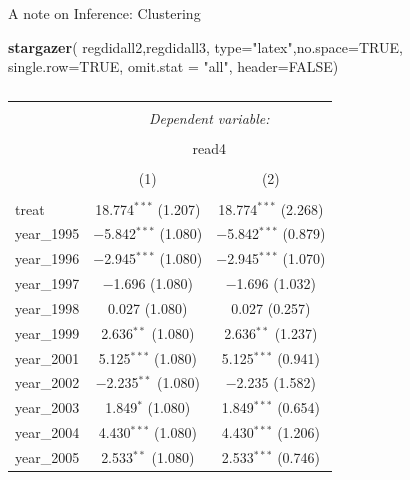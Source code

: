 \documentclass[
  ignorenonframetext,
]{beamer}
\newenvironment{Shaded}{\begin{snugshade}}{\end{snugshade}}
\newcommand{\DataTypeTok}[1]{\textcolor[rgb]{0.13,0.29,0.53}{#1}}
\newcommand{\KeywordTok}[1]{\textcolor[rgb]{0.13,0.29,0.53}{\textbf{#1}}}
\newcommand{\NormalTok}[1]{#1}
\newcommand{\OtherTok}[1]{\textcolor[rgb]{0.56,0.35,0.01}{#1}}
\newcommand{\StringTok}[1]{\textcolor[rgb]{0.31,0.60,0.02}{#1}}
\begin{document}
\begin{frame}[fragile]{A note on Inference: Clustering}
\protect\hypertarget{a-note-on-inference-clustering-2}{}
\tiny

\begin{Shaded}
\begin{Highlighting}[]
\KeywordTok{stargazer}\NormalTok{( regdidall2,regdidall3, }\DataTypeTok{type=}\StringTok{"latex"}\NormalTok{,}\DataTypeTok{no.space=}\OtherTok{TRUE}\NormalTok{, }\DataTypeTok{single.row=}\OtherTok{TRUE}\NormalTok{, }\DataTypeTok{omit.stat =} \StringTok{"all"}\NormalTok{, }\DataTypeTok{header=}\OtherTok{FALSE}\NormalTok{)}
\end{Highlighting}
\end{Shaded}

\begin{table}[!htbp] \centering 
  \caption{} 
  \label{} 
\begin{tabular}{@{\extracolsep{5pt}}lcc} 
\\[-1.8ex]\hline 
\hline \\[-1.8ex] 
 & \multicolumn{2}{c}{\textit{Dependent variable:}} \\ 
\cline{2-3} 
\\[-1.8ex] & \multicolumn{2}{c}{read4} \\ 
\\[-1.8ex] & (1) & (2)\\ 
\hline \\[-1.8ex] 
 treat & 18.774$^{***}$ (1.207) & 18.774$^{***}$ (2.268) \\ 
  year\_1995 & $-$5.842$^{***}$ (1.080) & $-$5.842$^{***}$ (0.879) \\ 
  year\_1996 & $-$2.945$^{***}$ (1.080) & $-$2.945$^{***}$ (1.070) \\ 
  year\_1997 & $-$1.696 (1.080) & $-$1.696 (1.032) \\ 
  year\_1998 & 0.027 (1.080) & 0.027 (0.257) \\ 
  year\_1999 & 2.636$^{**}$ (1.080) & 2.636$^{**}$ (1.237) \\ 
  year\_2001 & 5.125$^{***}$ (1.080) & 5.125$^{***}$ (0.941) \\ 
  year\_2002 & $-$2.235$^{**}$ (1.080) & $-$2.235 (1.582) \\ 
  year\_2003 & 1.849$^{*}$ (1.080) & 1.849$^{***}$ (0.654) \\ 
  year\_2004 & 4.430$^{***}$ (1.080) & 4.430$^{***}$ (1.206) \\ 
  year\_2005 & 2.533$^{**}$ (1.080) & 2.533$^{***}$ (0.746) \\ 

\end{tabular}
\end{table}
\end{frame}
\end{document}
